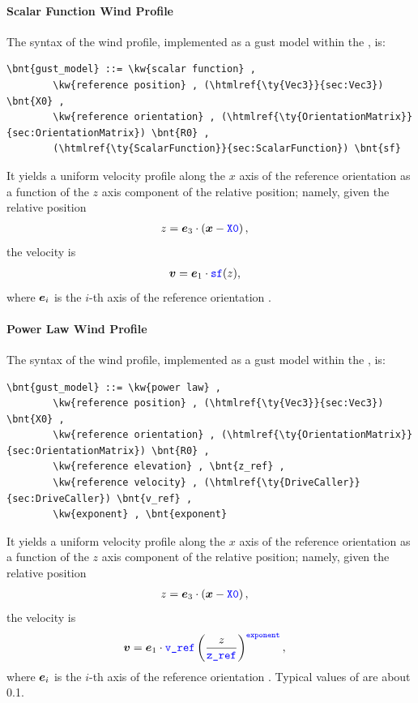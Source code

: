 \paragraph{Scalar Function Wind Profile}
The syntax of the  wind profile,
implemented as a gust model within the , is:
\begin{Verbatim}[commandchars=\\\{\}]
    \bnt{gust_model} ::= \kw{scalar function} ,
        \kw{reference position} , (\htmlref{\ty{Vec3}}{sec:Vec3}) \bnt{X0} ,
        \kw{reference orientation} , (\htmlref{\ty{OrientationMatrix}}{sec:OrientationMatrix}) \bnt{R0} ,
        (\htmlref{\ty{ScalarFunction}}{sec:ScalarFunction}) \bnt{sf}
\end{Verbatim}
It yields a uniform velocity profile along the $x$ axis of the
reference orientation as a function of the $z$ axis component
of the relative position; namely, given the relative position
\begin{align}
	z &= \boldsymbol{e}_3 \cdot \left( \boldsymbol{x} - \textcolor{blue}{\texttt{X0}} \right)
	,
\end{align}
the velocity is
\begin{align}
	\boldsymbol{v}
	&=
	\boldsymbol{e}_1 \cdot \textcolor{blue}{\texttt{sf}}(z)
	,
\end{align}
where $\boldsymbol{e}_i$ is the $i$-th axis of the reference orientation .



\paragraph{Power Law Wind Profile}
The syntax of the  wind profile, implemented as a gust model
within the , is:
\begin{Verbatim}[commandchars=\\\{\}]
    \bnt{gust_model} ::= \kw{power law} ,
        \kw{reference position} , (\htmlref{\ty{Vec3}}{sec:Vec3}) \bnt{X0} ,
        \kw{reference orientation} , (\htmlref{\ty{OrientationMatrix}}{sec:OrientationMatrix}) \bnt{R0} ,
        \kw{reference elevation} , \bnt{z_ref} ,
        \kw{reference velocity} , (\htmlref{\ty{DriveCaller}}{sec:DriveCaller}) \bnt{v_ref} ,
        \kw{exponent} , \bnt{exponent}
\end{Verbatim}
It yields a uniform velocity profile along the $x$ axis of the
reference orientation as a function of the $z$ axis component
of the relative position; namely, given the relative position
\begin{align}
	z &= \boldsymbol{e}_3 \cdot \left( \boldsymbol{x} - \textcolor{blue}{\texttt{X0}} \right)
	,
\end{align}
the velocity is
\begin{align}
	\boldsymbol{v}
	&=
	\boldsymbol{e}_1 \cdot \textcolor{blue}{\texttt{v\_ref}} \left( \frac{z}{\textcolor{blue}{\texttt{z\_ref}}} \right)^{\textcolor{blue}{\texttt{exponent}}}
	,
\end{align}
where $\boldsymbol{e}_i$ is the $i$-th axis of the reference orientation .
Typical values of  are about 0.1.




